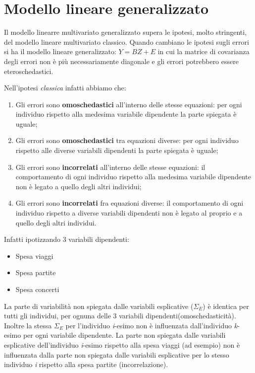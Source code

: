 \documentclass[a4page, 11pt]{article} %
\begin{document}
\section{Modello lineare generalizzato}
Il modello linearre multivariato generalizzato supera le ipotesi, molto stringenti, del modello lineare multivariato classico.
Quando cambiano le ipotesi sugli errori si ha il modello lineare generalizzato: $Y = BZ+E$ in cui la matrice di covarianza degli errori non è più necessariamente diagonale e gli errori potrebbero essere eteroschedastici. 

Nell’ipotesi \emph{classica} infatti abbiamo che:

\begin{enumerate}[noitemsep]
\item Gli errori sono \textbf{omoschedastici} all’interno delle stesse equazioni: per ogni individuo rispetto alla medesima variabile dipendente la parte spiegata è uguale;
\item Gli errori sono \textbf{omoschedastici} tra equazioni diverse: per ogni individuo rispetto alle diverse variabili dipendenti la parte spiegata è uguale;
\item Gli errori sono \textbf{incorrelati} all’interno delle stesse equazioni: il comportamento di ogni individuo rispetto alla medesima variabile dipendente non è legato a quello degli altri individui;
\item Gli errori sono \textbf{incorrelati} fra equazioni diverse: il comportamento di ogni individuo rispetto a diverse variabili dipendenti non è legato al proprio e a quello degli altri individui.
\end{enumerate}
Infatti ipotizzando 3 variabili dipendenti:
\begin{itemize}[noitemsep]
\item Spesa viaggi
\item Spesa partite
\item Spesa concerti
\end{itemize}
La parte di variabilità non spiegata dalle variabili esplicative ($\Sigma_{E}$) è identica per tutti gli individui, per ognuna delle 3  variabili dipendenti(omoschedasticità). Inoltre la stessa $\Sigma_E$ per l’individuo \textit{i}-esimo non è influenzata dall’individuo \textit{k}-esimo per ogni variabile dipendente. La parte non spiegata dalle variabili esplicative dell’individuo \textit{i}-esimo rispetto alla spesa viaggi (ad esempio) non è influenzata dalla parte non spiegata dalle variabili esplicative per lo stesso individuo \textit{i} rispetto alla spesa partite (incorrelazione).
\end{document}

